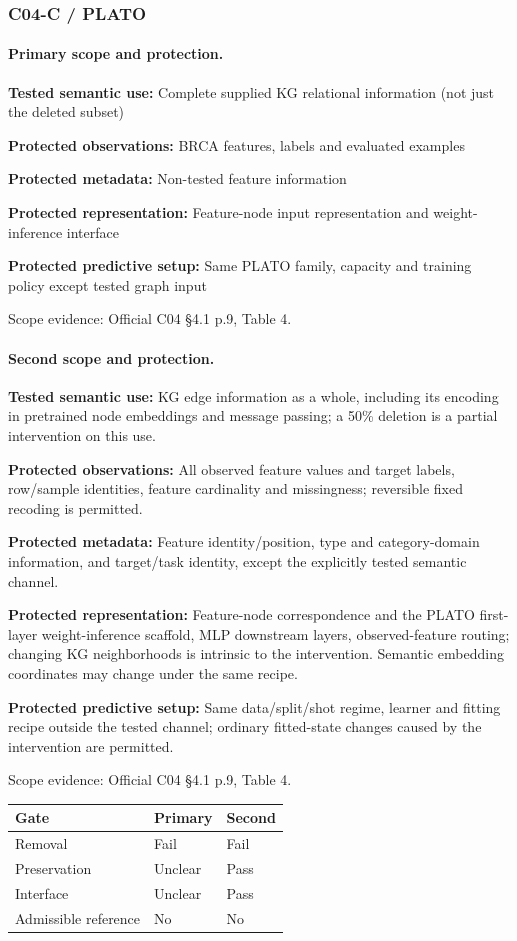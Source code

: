 \documentclass[10pt]{article}
\begin{document}
\subsubsection*{C04-C / PLATO}
\paragraph{Primary scope and protection.}
\textbf{Tested semantic use:} Complete supplied KG relational information (not just the deleted subset)\par
\textbf{Protected observations:} BRCA features, labels and evaluated examples\par
\textbf{Protected metadata:} Non-tested feature information\par
\textbf{Protected representation:} Feature-node input representation and weight-inference interface\par
\textbf{Protected predictive setup:} Same PLATO family, capacity and training policy except tested graph input\par
Scope evidence: Official C04 §4.1 p.9, Table 4.\par
\paragraph{Second scope and protection.}
\textbf{Tested semantic use:} KG edge information as a whole, including its encoding in pretrained node embeddings and message passing; a 50\% deletion is a partial intervention on this use.\par
\textbf{Protected observations:} All observed feature values and target labels, row/sample identities, feature cardinality and missingness; reversible fixed recoding is permitted.\par
\textbf{Protected metadata:} Feature identity/position, type and category-domain information, and target/task identity, except the explicitly tested semantic channel.\par
\textbf{Protected representation:} Feature-node correspondence and the PLATO first-layer weight-inference scaffold, MLP downstream layers, observed-feature routing; changing KG neighborhoods is intrinsic to the intervention. Semantic embedding coordinates may change under the same recipe.\par
\textbf{Protected predictive setup:} Same data/split/shot regime, learner and fitting recipe outside the tested channel; ordinary fitted-state changes caused by the intervention are permitted.\par
Scope evidence: Official C04 §4.1 p.9, Table 4.\par
\begin{tabular}{lll}\toprule Gate & Primary & Second \\ \midrule
Removal & Fail & Fail \\
Preservation & Unclear & Pass \\
Interface & Unclear & Pass \\
Admissible reference & No & No \\
\bottomrule\end{tabular}
\end{document}
